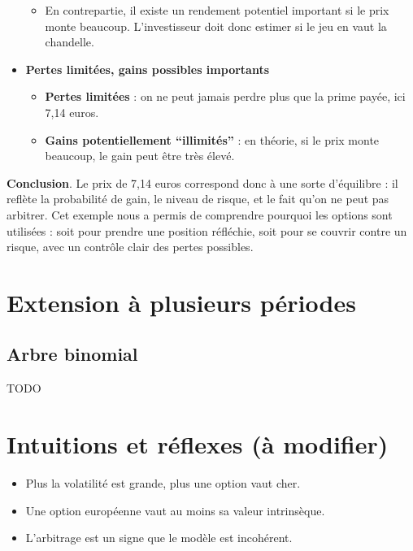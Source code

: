 \documentclass[12pt,a4paper]{article}
\newcommand{\quotes}[1]{``#1''}
\begin{document}
\begin{itemize}
\begin{itemize}
        \item En contrepartie, il existe un rendement potentiel important si le prix monte beaucoup. L’investisseur doit donc estimer si le jeu en vaut la chandelle.
    \end{itemize}

    \item \textbf{Pertes limitées, gains possibles importants}

    \begin{itemize}
        \item \textbf{Pertes limitées} : on ne peut jamais perdre plus que la prime payée, ici 7,14 euros.
        
        \item \textbf{Gains potentiellement \quotes{illimités}} : en théorie, si le prix monte beaucoup, le gain peut être très élevé.
    \end{itemize}
\end{itemize}

\textbf{Conclusion}. Le prix de 7,14 euros correspond donc à une sorte d’équilibre : il reflète la probabilité de gain, le niveau de risque, et le fait qu’on ne peut pas arbitrer. Cet exemple nous a permis de comprendre pourquoi les options sont utilisées : soit pour prendre une position réfléchie, soit pour se couvrir contre un risque, avec un contrôle clair des pertes possibles.

\section{Extension à plusieurs périodes}
\subsection{Arbre binomial}
TODO

\section{Intuitions et réflexes (à modifier)}
\begin{itemize}
  \item Plus la volatilité est grande, plus une option vaut cher.
  \item Une option européenne vaut au moins sa valeur intrinsèque.
  \item L’arbitrage est un signe que le modèle est incohérent.
\end{itemize}
\end{document}
